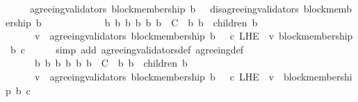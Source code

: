 \begin{isabellebody}
\ \ \ {\isasymlongrightarrow}\ \ agreeing{\isacharunderscore}validators\ {\isacharparenleft}block{\isacharunderscore}membership\ b{}{\isacharcomma}\ {\isasymsigma}{\isacharparenright}\ {\isasymsubseteq}\ disagreeing{\isacharunderscore}validators\ {\isacharparenleft}block{\isacharunderscore}membership\ b{}{\isacharcomma}\ {\isasymsigma}{\isacharparenright}{\isachardoublequoteclose}\isanewline
%
\isadelimproof
%
\endisadelimproof
%
\isatagproof
{}\isamarkupfalse%
\ {\isacharminus}\ \isanewline
\ \ \isamarkupfalse%
\ {\isachardoublequoteopen}{\isasymforall}\ {\isasymsigma}\ {\isasymin}\ {\isasymSigma}{\isachardot}\ {\isasymforall}\ b\ b{}\ b{}{\isachardot}\ {\isacharbraceleft}b{\isacharcomma}\ b{}{\isacharcomma}\ b{}{\isacharbraceright}\ {\isasymsubseteq}\ C\ {\isasymand}\ {\isacharbraceleft}b{}{\isacharcomma}\ b{}{\isacharbraceright}\ {\isasymsubseteq}\ children\ {\isacharparenleft}b{\isacharcomma}\ {\isasymsigma}{\isacharparenright}\ \isanewline
\ \ \ {\isasymlongrightarrow}\ \ {\isacharparenleft}{\isasymforall}\ v\ {\isasymin}\ agreeing{\isacharunderscore}validators\ {\isacharparenleft}block{\isacharunderscore}membership\ b{}{\isacharcomma}\ {\isasymsigma}{\isacharparenright}{\isachardot}\ {\isasymforall}\ c\ {\isasymin}L{\isacharunderscore}H{\isacharunderscore}E\ {\isasymsigma}\ v{\isachardot}\ block{\isacharunderscore}membership\ b{}\ c{\isacharparenright}{\isachardoublequoteclose}\isanewline
\ \ \ \ \isamarkupfalse%
\ {\isacharparenleft}simp\ add{\isacharcolon}\ agreeing{\isacharunderscore}validators{\isacharunderscore}def\ agreeing{\isacharunderscore}def{\isacharparenright}\isanewline
\ \ \isamarkupfalse%
\ {\isachardoublequoteopen}{\isasymforall}\ {\isasymsigma}\ {\isasymin}\ {\isasymSigma}{\isachardot}\ {\isasymforall}\ b\ b{}\ b{}{\isachardot}\ {\isacharbraceleft}b{\isacharcomma}\ b{}{\isacharcomma}\ b{}{\isacharbraceright}\ {\isasymsubseteq}\ C\ {\isasymand}\ {\isacharbraceleft}b{}{\isacharcomma}\ b{}{\isacharbraceright}\ {\isasymsubseteq}\ children\ {\isacharparenleft}b{\isacharcomma}\ {\isasymsigma}{\isacharparenright}\isanewline
\ \ \ {\isasymlongrightarrow}\ \ {\isacharparenleft}{\isasymforall}\ v\ {\isasymin}\ agreeing{\isacharunderscore}validators\ {\isacharparenleft}block{\isacharunderscore}membership\ b{}{\isacharcomma}\ {\isasymsigma}{\isacharparenright}{\isachardot}\ {\isasymexists}\ c\ {\isasymin}L{\isacharunderscore}H{\isacharunderscore}E\ {\isasymsigma}\ v{\isachardot}\ {\isasymnot}\ block{\isacharunderscore}membership\ b{}\ c{\isacharparenright}{\isachardoublequoteclose}\isanewline

\end{isabellebody}
